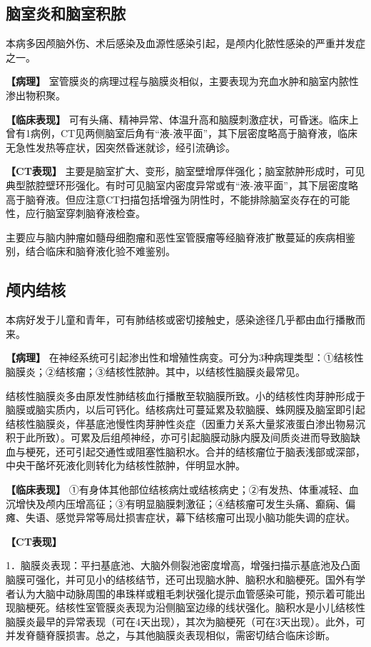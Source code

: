 \subsection{脑室炎和脑室积脓}

本病多因颅脑外伤、术后感染及血源性感染引起，是颅内化脓性感染的严重并发症之一。

\textbf{【病理】}
室管膜炎的病理过程与脑膜炎相似，主要表现为充血水肿和脑室内脓性渗出物积聚。

\textbf{【临床表现】}
可有头痛、精神异常、体温升高和脑膜刺激症状，可昏迷。临床上曾有1病例，CT见两侧脑室后角有“液-液平面”，其下层密度略高于脑脊液，临床无急性发热等症状，因突然昏迷就诊，经引流确诊。

\textbf{【CT表现】}
主要是脑室扩大、变形，脑室壁增厚伴强化；脑室脓肿形成时，可见典型脓腔壁环形强化。有时可见脑室内密度异常或有“液-液平面”，其下层密度略高于脑脊液。但应注意CT扫描包括增强为阴性时，不能排除脑室炎存在的可能性，应行脑室穿刺脑脊液检查。

主要应与脑内肿瘤如髓母细胞瘤和恶性室管膜瘤等经脑脊液扩散蔓延的疾病相鉴别，结合临床和脑脊液化验不难鉴别。

\subsection{颅内结核}

本病好发于儿童和青年，可有肺结核或密切接触史，感染途径几乎都由血行播散而来。

\textbf{【病理】}
在神经系统可引起渗出性和增殖性病变。可分为3种病理类型：①结核性脑膜炎；②结核瘤；③结核性脓肿。其中，以结核性脑膜炎最常见。

结核性脑膜炎多由原发性肺结核血行播散至软脑膜所致。小的结核性肉芽肿形成于脑膜或脑实质内，以后可钙化。结核病灶可蔓延累及软脑膜、蛛网膜及脑室即引起结核性脑膜炎，伴基底池慢性肉芽肿性炎症（因重力关系大量浆液蛋白渗出物易沉积于此所致）。可累及后组颅神经，亦可引起脑膜动脉内膜及间质炎进而导致脑缺血与梗死，还可引起交通性或阻塞性脑积水。合并的结核瘤位于脑表浅部或深部，中央干酪坏死液化则转化为结核性脓肿，伴明显水肿。

\textbf{【临床表现】}
①有身体其他部位结核病灶或结核病史；②有发热、体重减轻、血沉增快及颅内压增高征；③有明显脑膜刺激征；④结核瘤可发生头痛、癫痫、偏瘫、失语、感觉异常等局灶损害症状，幕下结核瘤可出现小脑功能失调的症状。

\textbf{【CT表现】}

1．脑膜炎表现：平扫基底池、大脑外侧裂池密度增高，增强扫描示基底池及凸面脑膜可强化，并可见小的结核结节，还可出现脑水肿、脑积水和脑梗死。国外有学者认为大脑中动脉周围的串珠样或粗毛刺状强化提示血管感染可能，预示着可能出现脑梗死。结核性室管膜炎表现为沿侧脑室边缘的线状强化。脑积水是小儿结核性脑膜炎最早的异常表现（可在4天出现），其次为脑梗死（可在3天出现）。此外，可并发脊髓脊膜损害。总之，与其他脑膜炎表现相似，需密切结合临床诊断。

